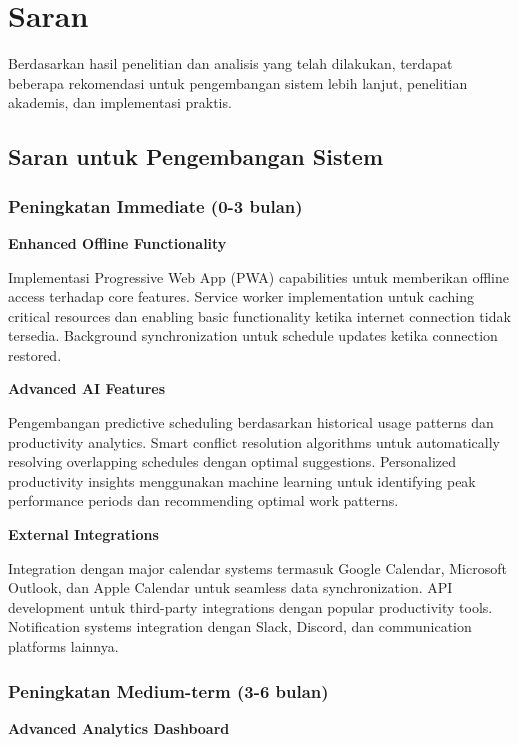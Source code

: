 \section{Saran}

Berdasarkan hasil penelitian dan analisis yang telah dilakukan, terdapat beberapa rekomendasi untuk pengembangan sistem lebih lanjut, penelitian akademis, dan implementasi praktis.

\subsection{Saran untuk Pengembangan Sistem}

\subsubsection{Peningkatan Immediate (0-3 bulan)}

\textbf{Enhanced Offline Functionality}

Implementasi Progressive Web App (PWA) capabilities untuk memberikan offline access terhadap core features. Service worker implementation untuk caching critical resources dan enabling basic functionality ketika internet connection tidak tersedia. Background synchronization untuk schedule updates ketika connection restored.

\textbf{Advanced AI Features}

Pengembangan predictive scheduling berdasarkan historical usage patterns dan productivity analytics. Smart conflict resolution algorithms untuk automatically resolving overlapping schedules dengan optimal suggestions. Personalized productivity insights menggunakan machine learning untuk identifying peak performance periods dan recommending optimal work patterns.

\textbf{External Integrations}

Integration dengan major calendar systems termasuk Google Calendar, Microsoft Outlook, dan Apple Calendar untuk seamless data synchronization. API development untuk third-party integrations dengan popular productivity tools. Notification systems integration dengan Slack, Discord, dan communication platforms lainnya.

\subsubsection{Peningkatan Medium-term (3-6 bulan)}

\textbf{Advanced Analytics Dashboard}

